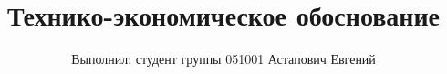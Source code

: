 

\title{Технико-экономическое обоснование}
\author{Выполнил: студент группы 051001 Астапович Евгений}
\date{}



\maketitle






